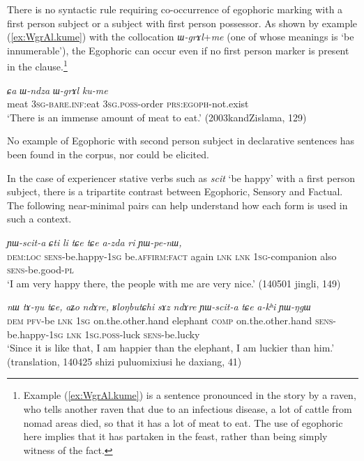 \documentclass[11pt]{article}
\newcommand{\ipa}[1]{{\phon\textit{#1}}} %
\begin{document}
There is no syntactic rule requiring co-occurrence of egophoric marking with a first person subject or a subject with first person possessor. As shown by example (\ref{ex:WgrAl.kume}) with the collocation \ipa{ɯ-grɤl}+\ipa{me} (one of whose meanings is `be innumerable'), the Egophoric can occur even if no first person marker is present in the clause.\footnote{Example (\ref{ex:WgrAl.kume}) is a sentence pronounced in the story by a raven, who tells another raven that due to an infectious disease, a lot of cattle from nomad areas died, so that it has a lot of meat to eat. The use of egophoric here implies that it has partaken in the feast, rather than being simply witness of the fact. }

\begin{exe}
\ex \label{ex:WgrAl.kume}
\gll 
\ipa{ɕa} 	\ipa{ɯ-ndza} 	\ipa{ɯ-grɤl} 	\ipa{ku-me} 	 \\
meat \textsc{3sg-bare.inf}:eat \textsc{3sg.poss}-order \textsc{prs:egoph}-not.exist   \\
\glt `There is an immense amount of meat to eat.' (2003kandZislama, 129)
 \end{exe}

No example of Egophoric with second person subject in declarative sentences has been found in the corpus, nor could be elicited.

In the case of experiencer stative verbs such as \ipa{scit} `be happy' with a first person subject, there is a tripartite contrast between Egophoric, Sensory and Factual. The following near-minimal pairs can help understand how each form is used in such a context.

\begin{exe}
\ex \label{ex:YWscita}
\gll  \ipa{nɯtɕu} 	\ipa{ɲɯ-scit-a} 	\ipa{ɕti} 	\ipa{li} 	\ipa{tɕe} 	\ipa{tɕe} 	\ipa{a-zda} 	\ipa{ri} 	\ipa{ɲɯ-pe-nɯ,} \\
\textsc{dem:loc} \textsc{sens}-be.happy-\textsc{1sg} be.\textsc{affirm}:\textsc{fact} again \textsc{lnk} \textsc{lnk} \textsc{1sg}-companion also \textsc{sens}-be.good-\textsc{pl} \\
\glt `I am very happy there, the people with me are very nice.' (140501 jingli, 149)
\end{exe}


\begin{exe}
\ex \label{ex:YWscita2}
\gll 
\ipa{nɯ} 	\ipa{tɤ-ŋu} 	\ipa{tɕe,} 	\ipa{aʑo} 	\ipa{ndɤre,} 	\ipa{ʁloŋbutɕhi} 	\ipa{sɤz} 	\ipa{ndɤre} 	\ipa{ɲɯ-scit-a} 	\ipa{tɕe} 	\ipa{a-kʰi} 	\ipa{ɲɯ-ŋgɯ} \\
\textsc{dem} \textsc{pfv}-be \textsc{lnk} \textsc{1sg} on.the.other.hand elephant \textsc{comp} on.the.other.hand \textsc{sens}-be.happy-\textsc{1sg} \textsc{lnk} \textsc{1sg.poss}-luck \textsc{sens}-be.lucky \\
\glt `Since it is like that, I am happier than the elephant, I am luckier than him.' (translation, 140425 shizi puluomixiusi he daxiang, 41)
\end{exe}
\end{document}
